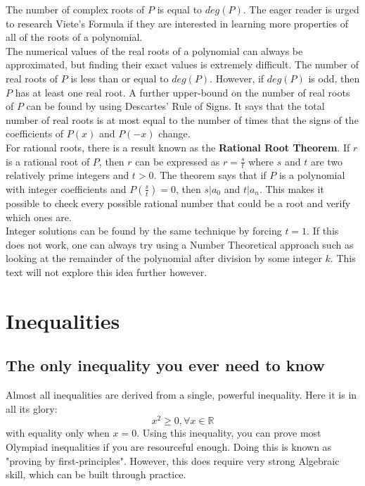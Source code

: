 \documentclass[a4paper,12pt]{article}
\begin{document}
The number of complex roots of $P$ is equal to $deg(P)$. The eager reader is urged to research Viete's Formula if they are interested in learning more properties of all of the roots of a polynomial. \\

The numerical values of the real roots of a polynomial can always be approximated, but finding their exact values is extremely difficult. The number of real roots of $P$ is less than or equal to $deg(P)$. However, if $deg(P)$ is odd, then $P$ has at least one real root. A further upper-bound on the number of real roots of $P$ can be found by using Descartes' Rule of Signs. It says that the total number of real roots is at most equal to the number of times that the signs of the coefficients of $P(x)$ and $P(-x)$ change. \\

For rational roots, there is a result known as the \textbf{Rational Root Theorem}. If $r$ is a rational root of $P$, then $r$ can be expressed as $r = \frac{s}{t}$ where $s$ and $t$ are two relatively prime integers and $t > 0$. The theorem says that if $P$ is a polynomial with integer coefficients and $P(\frac{s}{t}) = 0$, then $s | a_0$ and $t | a_n$. This makes it possible to  check every possible rational number that could be a root and verify which ones are.\\

Integer solutions can be found by the same technique by forcing $t = 1$. If this does not work, one can always try using a Number Theoretical approach such as looking at the remainder of the polynomial after division by some integer $k$. This text will not explore this idea further however.

\section{Inequalities}

\subsection{The only inequality you ever need to know}
Almost all inequalities are derived from a single, powerful inequality. Here it is in all its glory:
$$x^2 \geq 0, \forall x \in \mathbb{R}$$
with equality only when $x = 0$. Using this inequality, you can prove most Olympiad inequalities if you are resourceful enough.
Doing this is known as "proving by first-principles". However, this does require very strong Algebraic skill, which can be built through practice.\\
\end{document}
